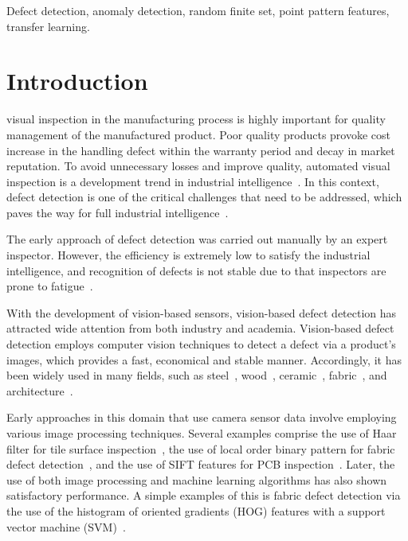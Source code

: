 \documentclass[journal]{IEEEtran}
\begin{document}
\begin{IEEEkeywords}
Defect detection, anomaly detection, random finite set, point pattern features, transfer learning.
\end{IEEEkeywords}






\IEEEpeerreviewmaketitle



\section{Introduction}
 visual inspection in the manufacturing process is highly important for quality management of the manufactured product. Poor quality products provoke cost increase in the handling defect within the warranty period and decay in market reputation. To avoid unnecessary losses and improve quality, automated visual inspection is a development trend in industrial intelligence~\cite{ngan2011automated}. In this context, defect detection is one of the critical challenges that need to be addressed, which paves the way for full industrial intelligence~\cite{gao2021review}.

The early approach of defect detection was carried out manually by an expert inspector. However, the efficiency is extremely low to satisfy the industrial intelligence, and recognition of defects is not stable due to that inspectors are prone to fatigue~\cite{neogi2014review}.

With the development of vision-based sensors, vision-based defect detection has attracted wide attention from both industry and academia. Vision-based defect detection employs computer vision techniques to detect a defect via a product's images, which provides a fast, economical and stable manner. Accordingly, it has been widely used in many fields, such as steel~\cite{wang2018simple}, wood~\cite{he2019fully}, ceramic~\cite{hanzaei2017automatic}, fabric~\cite{ngan2011automated}, and architecture~\cite{shen2013automated}.

Early approaches in this domain that use camera sensor data involve employing various image processing techniques. Several examples comprise the use of Haar filter for tile surface inspection~\cite{elbehiery2005visual}, the use of local order binary pattern for fabric defect detection~\cite{jing2013fabric}, and the use of SIFT features for PCB inspection~\cite{lowe2004distinctive}. Later, the use of both image processing and machine learning algorithms has also shown satisfactory performance. A simple examples of this is fabric defect detection via the use of the histogram of oriented gradients (HOG) features with a support vector machine (SVM)~\cite{shumin2011adaboost}.
\end{document}
